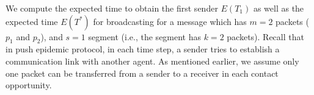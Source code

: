 % 
We compute the expected time to obtain the first sender $E(T_{1})$ as well
as the expected time $E\left( T^{\ast }\right) $ for broadcasting for a
message which has $m=2$ packets ($p_{1}$ and $p_{2}$), and $s=1$ segment
(i.e., the segment has $k=2$ packets). Recall that in push epidemic
protocol, in each time step, a sender tries to establish a communication
link with another agent. 
As mentioned earlier, we assume only one packet can be transferred from a
sender to a receiver in each contact opportunity.

